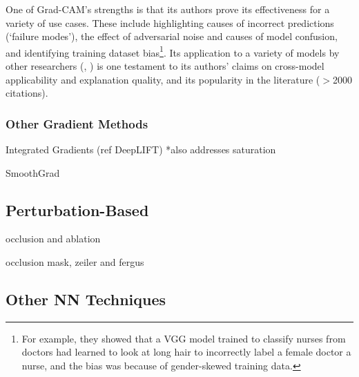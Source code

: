 \documentclass[main]{subfiles}
\begin{document}
One of Grad-CAM's strengths is that its authors prove its effectiveness for a variety of use cases. These include highlighting causes of incorrect predictions (`failure modes'), the effect of adversarial noise and causes of model confusion, and identifying training dataset bias\footnote{For example, they showed that a VGG model trained to classify nurses from doctors had learned to look at long hair to incorrectly label a female doctor a nurse, and the bias was because of gender-skewed training data.}. Its application to a variety of models by other researchers (\cite{gradcamplusplus}, \cite{xray}) is one testament to its authors' claims on cross-model applicability and explanation quality, and its popularity in the literature ($>$2000 citations). 



\subsubsection{Other Gradient Methods}

Integrated Gradients (ref DeepLIFT) *also addresses saturation

SmoothGrad







\subsection{Perturbation-Based}

occlusion and ablation

occlusion mask, zeiler and fergus


\subsection{Other NN Techniques}
\end{document}
